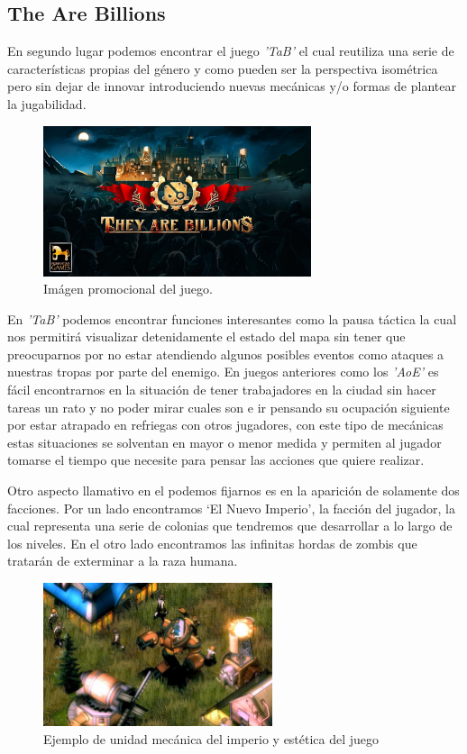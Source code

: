 \subsection{The Are Billions}
En segundo lugar podemos encontrar el juego \textit{'\acf{TaB}'} el cual reutiliza
una serie de características propias del género y como pueden ser la perspectiva
isométrica pero sin dejar de innovar introduciendo nuevas mecánicas y/o formas de
plantear la jugabilidad.

\begin{figure}[ht]
\centering
\includegraphics[width=0.7\textwidth]{imagenes/marco_teo/referentes/tab_1.png}
\caption{Imágen promocional del juego.}
\label{img:tab_1}
\end{figure}
 
En \textit{'\ac{TaB}'} podemos encontrar funciones interesantes como la pausa
táctica la cual nos permitirá visualizar detenidamente el estado del mapa sin tener que
preocuparnos por no estar atendiendo algunos posibles eventos como ataques a nuestras
tropas por parte del enemigo. En juegos anteriores como los \textit{'\ac{AoE}'} es
fácil encontrarnos en la situación de tener trabajadores en la ciudad sin hacer tareas
un rato y no poder mirar cuales son e ir pensando su ocupación siguiente por estar
atrapado en refriegas con otros jugadores, con este tipo de mecánicas estas situaciones
se solventan en mayor o menor medida y permiten al jugador tomarse el tiempo que
necesite para pensar las acciones que quiere realizar.

Otro aspecto llamativo en el podemos fijarnos es en la aparición de solamente dos
facciones. Por un lado encontramos `El Nuevo Imperio', la facción del jugador, la
cual representa una serie de colonias que tendremos que desarrollar a lo largo de
los niveles. En el otro lado encontramos las infinitas hordas de zombis que tratarán
de exterminar a la raza humana.

\begin{figure}[ht]
\centering
\includegraphics[width=0.6\textwidth]{imagenes/marco_teo/referentes/tab_2.png}
\caption{Ejemplo de unidad mecánica del imperio y estética del juego}
\label{img:tab_2}
\end{figure}

